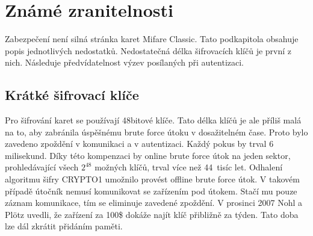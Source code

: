 \chapter{Známé zranitelnosti}
\label{zranitelnosti}
Zabezpečení není silná stránka karet Mifare Classic. Tato podkapitola obsahuje popis jednotlivých nedostatků. Nedostatečná délka šifrovacích klíčů je první z nich. Následuje předvídatelnost výzev posílaných při autentizaci.
\par
\section{Krátké šifrovací klíče}
Pro šifrování karet se používají 48bitové klíče. Tato délka klíčů je ale příliš malá na to, aby zabránila úspěšnému brute force útoku v dosažitelném čase. Proto bylo zavedeno zpoždění v komunikaci a v autentizaci. Každý pokus by trval 6 milisekund. Díky této kompenzaci by online brute force útok na jeden sektor, prohledávající všech $2^{48}$ možných klíčů, trval více než 44~tisíc let. Odhalení algoritmu šifry CRYPTO1 umožnilo provést offline brute force útok. V takovém případě útočník nemusí komunikovat se zařízením pod útokem. Stačí mu pouze záznam komunikace, tím se eliminuje zavedené zpoždění. V prosinci 2007 Nohl a Plötz uvedli, že zařízení za 100\$ dokáže najít klíč přibližně za týden. Tato doba lze dál zkrátit přidáním paměti\cite{Cryptanalisis}.
\par
